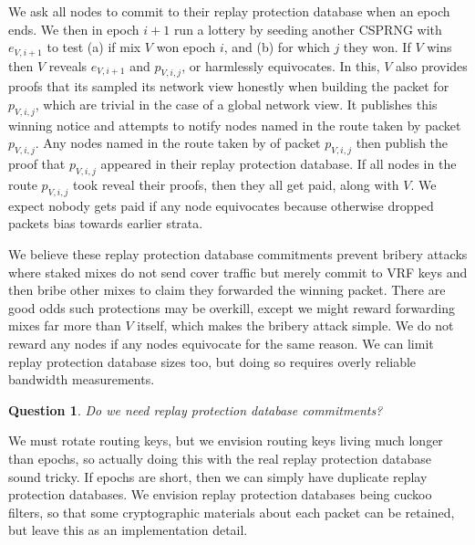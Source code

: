 ﻿\documentclass{sig-alternate-hotpets}
\newtheorem{question}{Question}
\begin{document}
We ask all nodes to commit to their replay protection database when an epoch ends.  We then in epoch $i+1$ run a lottery by seeding another CSPRNG with $e_{V,i+1}$ to test (a) if mix $V$ won epoch $i$, and (b) for which $j$ they won.  If $V$ wins then $V$ reveals $e_{V,i+1}$ and $p_{V,i,j}$, or harmlessly equivocates.  In this, $V$ also provides proofs that its sampled its network view honestly when building the packet for $p_{V,i,j}$, which are trivial in the case of a global network view.  It publishes this winning notice and attempts to notify nodes named in the route taken by packet $p_{V,i,j}$.  Any nodes named in the route taken by of packet $p_{V,i,j}$ then publish the proof that $p_{V,i,j}$ appeared in their replay protection database.  If all nodes in the route $p_{V,i,j}$ took reveal their proofs, then they all get paid, along with $V$.  We expect nobody gets paid if any node equivocates because otherwise dropped packets bias towards earlier strata.

We believe these replay protection database commitments prevent bribery attacks where staked mixes do not send cover traffic but merely commit to VRF keys and then bribe other mixes to claim they forwarded the winning packet.  There are good odds such protections may be overkill, except we might reward forwarding mixes far more than $V$ itself, which makes the bribery attack simple.  We do not reward any nodes if any nodes equivocate for the same reason.  We can limit replay protection database sizes too, but doing so requires overly reliable bandwidth measurements.

\begin{question}
Do we need replay protection database commitments?
\end{question}

We must rotate routing keys, but we envision routing keys living much longer than epochs, so actually doing this with the real replay protection database sound tricky.  If epochs are short, then we can simply have duplicate replay protection databases.  We envision replay protection databases being cuckoo filters, so that some cryptographic materials about each packet can be retained, but leave this as an implementation detail.

\end{document}
